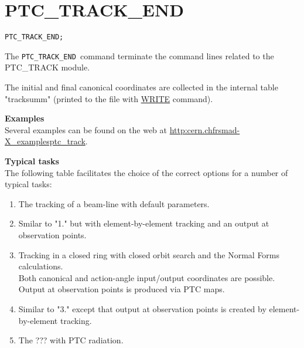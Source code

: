 \section{PTC\_TRACK\_END}

\begin{verbatim}
PTC_TRACK_END;
\end{verbatim}

The \texttt{PTC\_TRACK\_END }command terminate the command lines related
to the PTC\_TRACK module. 

The initial and final canonical coordinates are collected in the
internal table "tracksumm" (printed to the file with
\href{../control/general.html#write}{WRITE} command). 


{\bf Examples}\\
 Several examples can be found on the web at
 \href{http://cern.ch/frs/mad-X_examples/ptc_track}{http:\/\/cern.ch\/frs\/mad-X\_examples\/ptc\_track}. 

{\bf Typical tasks}\\ 
The following table facilitates the choice of the correct options for a
number of typical tasks: 
\begin{enumerate} %
   \item The tracking of a beam-line with default parameters.
   \item Smilar to "1." but with element-by-element tracking and an output 
     at observation points. 
   \item Tracking in a closed ring with closed orbit search and the 
     Normal Forms calculations.\\ 
     Both canonical and action-angle input/output coordinates are
     possible.\\
     Output at observation points is produced via PTC maps. 
   \item Similar to "3." except that output at observation points is 
     created by element-by-element tracking.
   \item The ??? with PTC radiation.
\end{enumerate}
    

